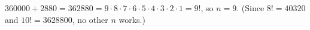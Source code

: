 $360000+2880=362880=9\cdot8\cdot7\cdot6\cdot5\cdot4\cdot3\cdot2\cdot1=9!$, so $n=\boxed{9}$. (Since $8!=40320$ and $10!=3628800$, no other $n$ works.)
